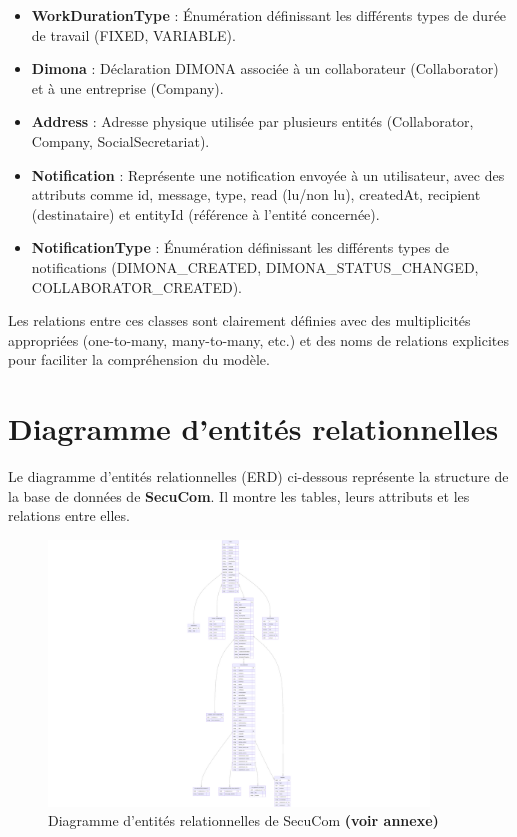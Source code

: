\begin{itemize}[leftmargin=*,label=\textcolor{darkgray}{$\bullet$},itemsep=0.3em]
  \item \textbf{WorkDurationType} : Énumération définissant les différents types de durée de travail (FIXED, VARIABLE).

  \item \textbf{Dimona} : Déclaration DIMONA associée à un collaborateur (Collaborator) et à une entreprise (Company).

  \item \textbf{Address} : Adresse physique utilisée par plusieurs entités (Collaborator, Company, SocialSecretariat).
  
  \item \textbf{Notification} : Représente une notification envoyée à un utilisateur, avec des attributs comme id, message, type, read (lu/non lu), createdAt, recipient (destinataire) et entityId (référence à l'entité concernée).
  
  \item \textbf{NotificationType} : Énumération définissant les différents types de notifications (DIMONA\_CREATED, DIMONA\_STATUS\_CHANGED, COLLABORATOR\_CREATED).
\end{itemize}

Les relations entre ces classes sont clairement définies avec des multiplicités appropriées (one-to-many, many-to-many, etc.) et des noms de relations explicites pour faciliter la compréhension du modèle.

\newpage

\section{Diagramme d'entités relationnelles}

\noindent Le diagramme d'entités relationnelles (ERD) ci-dessous représente la structure de la base de données de \textbf{SecuCom}. Il montre les tables, leurs attributs et les relations entre elles.

\begin{figure}[H]
\centering
\includegraphics[width=0.9\textwidth]{ERD.png}
\caption{Diagramme d'entités relationnelles de SecuCom \textbf{(voir annexe)}}
\end{figure}

